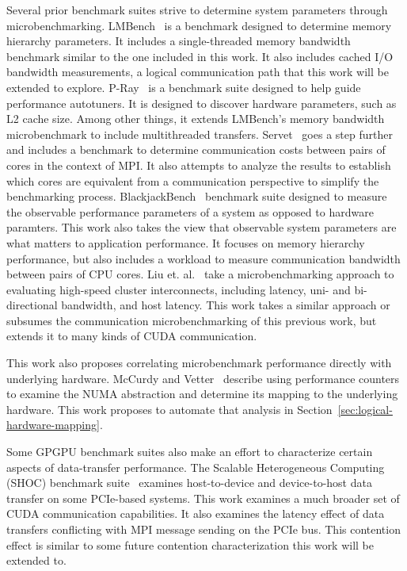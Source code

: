 Several prior benchmark suites strive to determine system parameters through microbenchmarking.
LMBench~\cite{mcvoy1996lmbench} is a benchmark designed to determine memory hierarchy parameters.
It includes a single-threaded memory bandwidth benchmark similar to the one included in this work.
It also includes cached I/O bandwidth measurements, a logical communication path that this work will be extended to explore.
P-Ray~\cite{duchateau2008p} is a benchmark suite designed to help guide performance autotuners.
It is designed to discover hardware parameters, such as L2 cache size.
Among other things, it extends LMBench's memory bandwidth microbenchmark to include multithreaded transfers.
Servet~\cite{gonzalez2010servet} goes a step further and includes a benchmark to determine communication costs between pairs of cores in the context of MPI.
It also attempts to analyze the results to establish which cores are equivalent from a communication perspective to simplify the benchmarking process.
BlackjackBench~\cite{danalis2012blackjackbench} benchmark suite designed to measure the observable performance parameters of a system as opposed to hardware paramters.
This work also takes the view that observable system parameters are what matters to application performance.
It focuses on memory hierarchy performance, but also includes a workload to measure communication bandwidth between pairs of CPU cores.
Liu et. al.~\cite{liu2004microbenchmark} take a microbenchmarking approach to evaluating high-speed cluster interconnects, including latency, uni- and bi-directional bandwidth, and host latency.
This work takes a similar approach or subsumes the communication microbenchmarking of this previous work, but extends it to many kinds of CUDA communication.

This work also proposes correlating microbenchmark performance directly with underlying hardware.
McCurdy and Vetter~\cite{mccurdy2010memphis} describe using performance counters to examine the NUMA abstraction and determine its mapping to the underlying hardware.
This work proposes to automate that analysis in Section~\ref{sec:logical-hardware-mapping}.

Some GPGPU benchmark suites also make an effort to characterize certain aspects of data-transfer performance.
The Scalable Heterogeneous Computing (SHOC) benchmark suite~\cite{danalis2010scalable} examines host-to-device and device-to-host data transfer on some PCIe-based systems.
This work examines a much broader set of CUDA communication capabilities.
It also examines the latency effect of data transfers conflicting with MPI message sending on the PCIe bus.
This contention effect is similar to some future contention characterization this work will be extended to.

